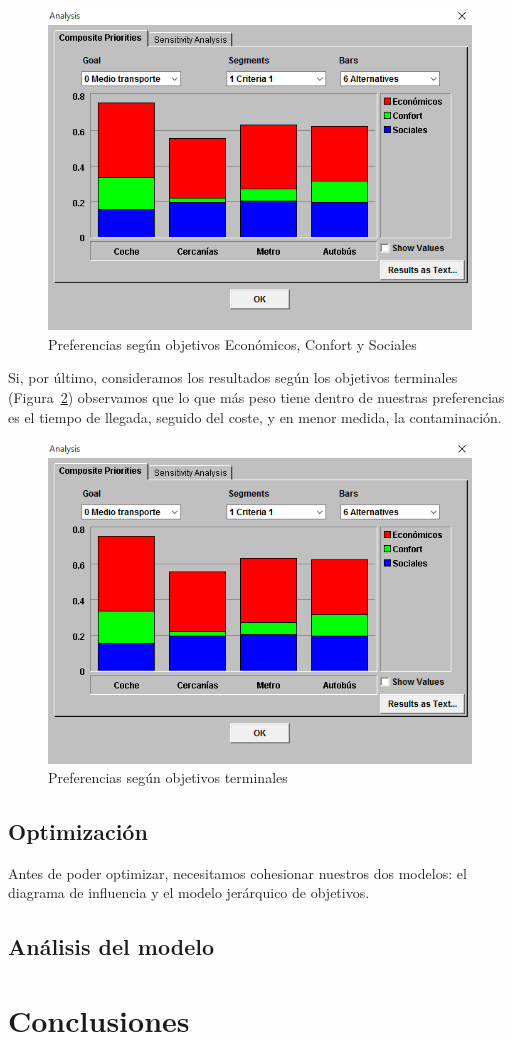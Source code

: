 \documentclass[12pt,a4paper,twoside,openright,titlepage,final]{article}
\begin{document}
\begin{figure}[htbp!]
\centering
\includegraphics[width=0.5\linewidth]{imagenes/analisis_1}
\caption{Preferencias según objetivos Económicos, Confort y Sociales} \label{fig:analisis_1}
\end{figure}

Si, por último, consideramos los resultados según los objetivos terminales (Figura~\ref{fig:analisis_2}) observamos que lo que más peso tiene dentro de nuestras preferencias es el tiempo de llegada, seguido del coste, y en menor medida, la contaminación.\\

\begin{figure}[htbp!]
\centering
\includegraphics[width=0.5\linewidth]{imagenes/analisis_1}
\caption{Preferencias según objetivos terminales} \label{fig:analisis_2}
\end{figure}

\subsection{Optimización}

Antes de poder optimizar, necesitamos cohesionar nuestros dos modelos: el diagrama de influencia y el modelo jerárquico de objetivos.\\

\subsection{Análisis del modelo}

\section{Conclusiones}
\end{document}
